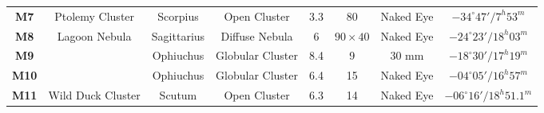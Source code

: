 \documentclass[a4paper,12pt]{extarticle}
\begin{document}
\begin{table}[H]
\begin{tabular}{cccccccc}
\textbf{M7}                              & Ptolemy Cluster                                                   & Scorpius                                      & Open Cluster                           & 3.3                                                                                           & 80                                                                                              & Naked Eye                                                                                   & $-34^\circ 47'/ 7^h 53^m$                                                                    \\
\rowcolor[HTML]{E6B8AF} 
\textbf{M8}                              & Lagoon Nebula                                                     & Sagittarius                                   & Diffuse Nebula                         & 6                                                                                             & $90 \times 40$                                                                                  & Naked Eye                                                                                   & $-24^\circ 23'/ 18^h 03^m$                                                                   \\
\rowcolor[HTML]{FFF2CC} 
\textbf{M9}                              & \multicolumn{1}{l}{\cellcolor[HTML]{FFF2CC}}                      & Ophiuchus                                     & Globular Cluster                       & 8.4                                                                                           & 9                                                                                               & 30 mm                                                                                       & $-18^\circ 30'/ 17^h 19^m$                                                                   \\
\rowcolor[HTML]{FFF2CC} 
\textbf{M10}                             & \multicolumn{1}{l}{\cellcolor[HTML]{FFF2CC}}                      & Ophiuchus                                     & Globular Cluster                       & 6.4                                                                                           & 15                                                                                              & Naked Eye                                                                                   & $-04^\circ 05'/ 16^h 57^m$                                                                   \\
\rowcolor[HTML]{D9EAD3} 
\textbf{M11}                             & Wild Duck Cluster                                                 & Scutum                                        & Open Cluster                           & 6.3                                                                                           & 14                                                                                              & Naked Eye                                                                                   & $-06^\circ 16'/ 18^h 51.1^m$                                                                 \\

\end{tabular}
\end{table}
\end{document}
